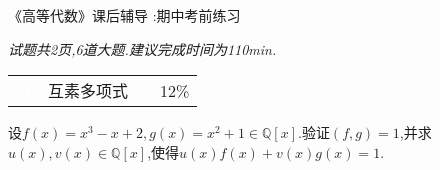 \documentclass[a4paper]{article}
\begin{document}
\begin{spacing}{1.5}

\begin{center}
    \begin{Large}
    
    {《高等代数》课后辅导 :期中考前练习}
    \end{Large}
\end{center}

\everymath{\displaystyle}
\begin{center}
    
    \textit{试题共2页,6道大题.建议完成时间为110min.}
    
    
\end{center}

\vspace{5mm}
\begin{table}[!ht]
	\renewcommand\arraystretch{2}
	\begin{tabular}{m{1cm}<{\centering}m{12cm}m{2cm}m{1.5cm}<{\centering}}
 \Large\cellcolor{black} \textcolor{white}{\textsf{01}}  & \large \cellcolor{lightgray}\textsf{互素多项式} & &\cellcolor{lightgray} \large{12\%} \\
\end{tabular}
\end{table}设$f(x)=x^3-x+2,g(x)=x^2+1\in\mathbb{Q}[x]$.验证$(f,g)=1$,并求$u(x),v(x)\in\mathbb{Q}[x]$,使得$u(x)f(x)+v(x)g(x)=1$.
\vspace{20mm}






\end{spacing}
\end{document}
